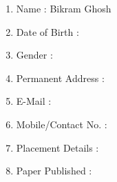 \documentclass[oneside,a4paper,12pt]{report}
\begin{document}
\begin{appendices}
\begin{enumerate}
\end{enumerate}
\newpage
\begin{enumerate}
\item Name : Bikram Ghosh \hspace{62 mm}\fbox{\parbox[c][75pt][c]{60pt}{\centering\scriptsize [Photo]}}
\item Date of Birth :
\item Gender :
\item Permanent Address :
\item E-Mail :
\item Mobile/Contact No. :
\item Placement Details :
\item Paper Published :

\end{enumerate}
\end{appendices}
\end{document}
